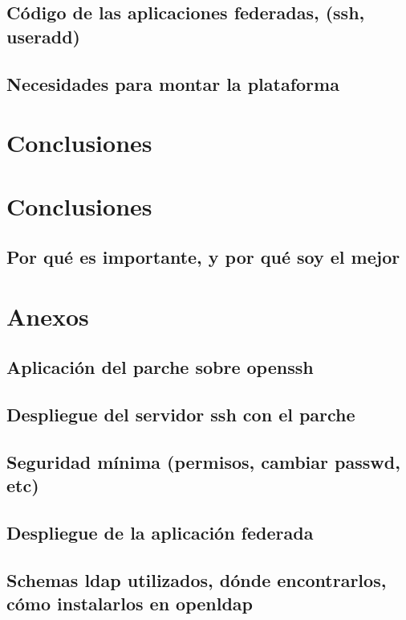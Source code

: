     \section{Código de las aplicaciones federadas, (ssh, useradd)}
    \section{Necesidades para montar la plataforma}



\chapter{Conclusiones}
\chapter{Conclusiones}
    \section{Por qué es importante, y por qué soy el mejor}



\chapter{Anexos}
    \section{Aplicación del parche sobre openssh}
    \section{Despliegue del servidor ssh con el parche}
    \section{Seguridad mínima (permisos, cambiar passwd, etc)}
    \section{Despliegue de la aplicación federada}
    \section{Schemas ldap utilizados, dónde encontrarlos, cómo instalarlos
    en openldap}

\newpage



